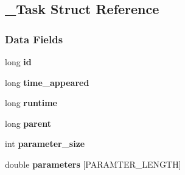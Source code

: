 \hypertarget{a00002}{}\subsection{\+\_\+\+Task Struct Reference}
\label{a00002}
\subsubsection*{Data Fields}
\begin{DoxyCompactItemize}
\item 
\hypertarget{a00002_a3e198cda3edc239403fed91b7e3bddd3}{}long {\bfseries id}\label{a00002_a3e198cda3edc239403fed91b7e3bddd3}

\item 
\hypertarget{a00002_af6627e17a6012b29392f3decfcc52c99}{}long {\bfseries time\+\_\+appeared}\label{a00002_af6627e17a6012b29392f3decfcc52c99}

\item 
\hypertarget{a00002_a80384e5d5e6fa5e8d05157b3141cb6d3}{}long {\bfseries runtime}\label{a00002_a80384e5d5e6fa5e8d05157b3141cb6d3}

\item 
\hypertarget{a00002_a43b9da2fb27d3203075553043250a0a6}{}long {\bfseries parent}\label{a00002_a43b9da2fb27d3203075553043250a0a6}

\item 
\hypertarget{a00002_ac0f438d616d66857ac9a10d58e7a2c3e}{}int {\bfseries parameter\+\_\+size}\label{a00002_ac0f438d616d66857ac9a10d58e7a2c3e}

\item 
\hypertarget{a00002_ab8513f93ddd80bfbc5f9e30d931d0650}{}double {\bfseries parameters} \mbox{[}P\+A\+R\+A\+M\+T\+E\+R\+\_\+\+L\+E\+N\+G\+T\+H\mbox{]}\label{a00002_ab8513f93ddd80bfbc5f9e30d931d0650}

\end{DoxyCompactItemize}
